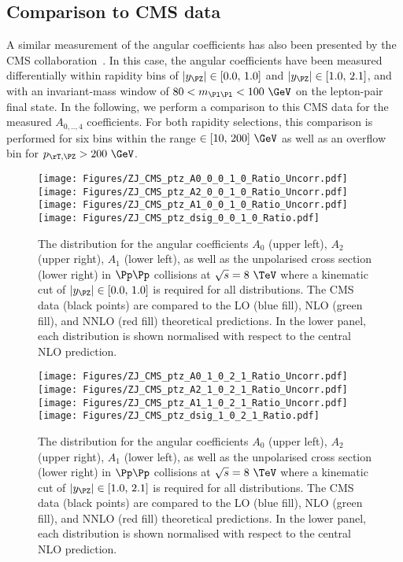 \subsection{Comparison to CMS data}
A similar measurement of the angular coefficients has also been 
presented by the CMS collaboration~\cite{Khachatryan:2015paa}.
In this case, the angular coefficients have been measured differentially within rapidity 
bins of $\lvert\yz\rvert \in [0.0,\,1.0]$ and $\lvert\yz\rvert \in [1.0,\,2.1]$, and with an invariant-mass 
window of $80 < m_{\Pl\Pl} < 100~\GeV$ on the lepton-pair final state.
% 
In the following, we perform a comparison to this CMS data for the measured $A_{0,..,4}$ coefficients.
For both rapidity selections, this comparison is performed for six bins within the range \ptz $\in [10,\,200]~\GeV$ 
as well as an overflow bin for $\ptz > 200~\GeV$.

\begin{figure}
\centering
\texttt{[image: Figures/ZJ\_CMS\_ptz\_A0\_0\_0\_1\_0\_Ratio\_Uncorr.pdf]} \hfill
\texttt{[image: Figures/ZJ\_CMS\_ptz\_A2\_0\_0\_1\_0\_Ratio\_Uncorr.pdf]} \\
\texttt{[image: Figures/ZJ\_CMS\_ptz\_A1\_0\_0\_1\_0\_Ratio\_Uncorr.pdf]} \hfill
\texttt{[image: Figures/ZJ\_CMS\_ptz\_dsig\_0\_0\_1\_0\_Ratio.pdf]}
\caption{
The \ptz distribution for the angular coefficients $A_0$ (upper left), $A_2$ (upper right),
$A_1$ (lower left), as well as the unpolarised cross section (lower right) in $\Pp\Pp$ collisions at $\sqrt{s} = 8~\TeV$
where a kinematic cut of $\lvert\yz\rvert \in [0.0,\,1.0]$ is required for all distributions.
The CMS data (black points) are compared to the LO (blue fill), NLO (green fill), and NNLO (red fill) 
theoretical predictions. In the lower panel, each distribution is shown normalised 
with respect to the central NLO prediction.
}
\label{fig:CMS_1}
\end{figure}
\begin{figure}
\centering
\texttt{[image: Figures/ZJ\_CMS\_ptz\_A0\_1\_0\_2\_1\_Ratio\_Uncorr.pdf]} \hfill
\texttt{[image: Figures/ZJ\_CMS\_ptz\_A2\_1\_0\_2\_1\_Ratio\_Uncorr.pdf]} \\
\texttt{[image: Figures/ZJ\_CMS\_ptz\_A1\_1\_0\_2\_1\_Ratio\_Uncorr.pdf]} \hfill
\texttt{[image: Figures/ZJ\_CMS\_ptz\_dsig\_1\_0\_2\_1\_Ratio.pdf]}
\caption{
The \ptz distribution for the angular coefficients $A_0$ (upper left), $A_2$ (upper right),
$A_1$ (lower left), as well as the unpolarised cross section (lower right) in $\Pp\Pp$ collisions at $\sqrt{s} = 8~\TeV$
where a kinematic cut of $\lvert\yz\rvert \in [1.0,\,2.1]$ is required for all distributions.
The CMS data (black points) are compared to the LO (blue fill), NLO (green fill), and NNLO (red fill) 
theoretical predictions. In the lower panel, each distribution is shown normalised 
with respect to the central NLO prediction.
}
\label{fig:CMS_2}
\end{figure}

